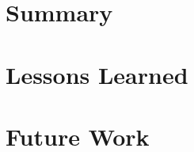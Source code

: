 \documentclass[bsc,frontabs,singlespacing,parskip,deptreport,normalheadings]{infthesis}
\begin{document}
\section{Summary}

\section{Lessons Learned}

\section{Future Work}




%
%
%
\end{document}
